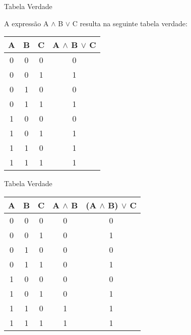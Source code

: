 \begin{frame}{Tabela Verdade}

	A expressão A $\wedge$ B $\vee$ C resulta na seguinte tabela verdade:

		\begin{center}
		\begin{tabular}{|c|c|c|c|} \hline 
			\textbf{A} & \textbf{B} & \textbf{C} & \textbf{A $\wedge$ B $\vee$ C} \\ \hline 
			0 & 0 & 0 & 0 \\ \hline 
			0 & 0 & 1 & 1 \\ \hline 
			0 & 1 & 0 & 0 \\ \hline 
			0 & 1 & 1 & 1 \\ \hline 
			1 & 0 & 0 & 0 \\ \hline 
			1 & 0 & 1 & 1 \\ \hline 
			1 & 1 & 0 & 1 \\ \hline 
			1 & 1 & 1 & 1 \\ \hline 
		\end{tabular} 
		\end{center}

\end{frame}


\begin{frame}{Tabela Verdade}



		\begin{center}
		\begin{tabular}{|c|c|c|c|c|} \hline 
			\textbf{A} & \textbf{B} & \textbf{C} & 
			\textbf{A $\wedge$ B} &
			\textbf{(A $\wedge$ B) $\vee$ C} \\ \hline 
			0 & 0 & 0 & 0 & 0 \\ \hline 
			0 & 0 & 1 & 0 & 1 \\ \hline 
			0 & 1 & 0 & 0 & 0 \\ \hline 
			0 & 1 & 1 & 0 & 1 \\ \hline 
			1 & 0 & 0 & 0 & 0 \\ \hline 
			1 & 0 & 1 & 0 & 1 \\ \hline 
			1 & 1 & 0 & 1 & 1 \\ \hline 
			1 & 1 & 1 & 1 & 1 \\ \hline 
		\end{tabular} 
		\end{center}

\end{frame}


